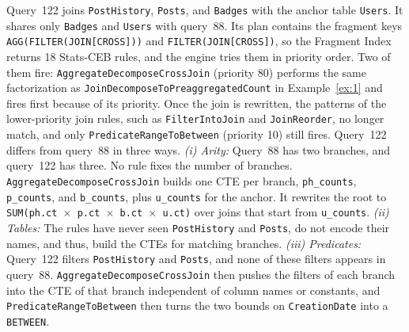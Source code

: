 \vspace{-0.25cm}
\begin{example}
\label{example:online_rewrite}
\sloppy
Query~122 joins \texttt{Post\allowbreak History}, \texttt{Posts}, and \texttt{Badges} with the anchor table \texttt{Users}.
It shares only \texttt{Badges} and \texttt{Users} with query~88.
Its plan contains the fragment keys \texttt{AGG(\allowbreak FILTER(\allowbreak JOIN[CROSS]))} and \texttt{FILTER(\allowbreak JOIN[CROSS])}, so the Fragment Index returns 18 Stats-CEB rules, and the engine tries them in priority order. Two of them fire: \texttt{AggregateDecompose\allowbreak CrossJoin} (priority 80) performs the same factorization as \texttt{JoinDecomposeTo\allowbreak Preaggregated\allowbreak Count} in Example~\ref{ex:1} and fires first because of its priority. Once the join is rewritten, the patterns of the lower-priority join rules, such as \texttt{FilterIntoJoin} and \texttt{JoinReorder}, no longer match, and only \texttt{PredicateRange\allowbreak ToBetween} (priority 10) still fires.
Query~122 differs from query~88 in three ways.
\emph{(i) Arity:}
Query~88 has two branches, and query~122 has three.
No rule fixes the number of branches.
\texttt{AggregateDecompose\allowbreak CrossJoin} builds one CTE per branch, \texttt{ph\_\allowbreak counts}, \texttt{p\_\allowbreak counts}, and \texttt{b\_\allowbreak counts}, plus \texttt{u\_\allowbreak counts} for the anchor.
It rewrites the root to \texttt{SUM(ph.ct\,$\times$\allowbreak\,p.ct\,$\times$\allowbreak\,b.ct\,$\times$\allowbreak\,u.ct)} over joins that start from \texttt{u\_\allowbreak counts}.
\emph{(ii) Tables:}
The rules have never seen \texttt{Post\allowbreak History} and \texttt{Posts}, do not encode their names, and thus, build the CTEs for matching branches.
\emph{(iii) Predicates:}
Query~122 filters \texttt{Post\allowbreak History} and \texttt{Posts}, and none of these filters appears in query~88.
\texttt{AggregateDecompose\allowbreak CrossJoin} then pushes the filters of each branch into the CTE of that branch independent of column names or constants, and \texttt{PredicateRange\allowbreak ToBetween} then turns the two bounds on \texttt{CreationDate} into a \texttt{BETWEEN}.
\end{example}

